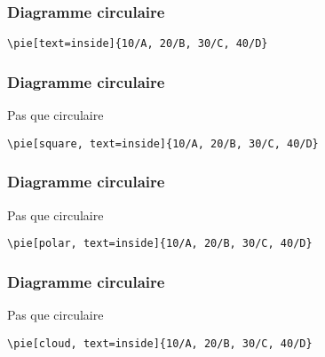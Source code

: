 \documentclass{clic_latex_beamer}
\begin{document}
\begin{frame}[fragile]
\frametitle{Diagramme circulaire}



\begin{lstlisting}
\pie[text=inside]{10/A, 20/B, 30/C, 40/D}
\end{lstlisting}

\end{frame}

\begin{frame}[fragile]
\frametitle{Diagramme circulaire}
Pas que circulaire



\begin{lstlisting}
\pie[square, text=inside]{10/A, 20/B, 30/C, 40/D}
\end{lstlisting}

\end{frame}

\begin{frame}[fragile]
\frametitle{Diagramme circulaire}
Pas que circulaire



\begin{lstlisting}
\pie[polar, text=inside]{10/A, 20/B, 30/C, 40/D}
\end{lstlisting}

\end{frame}

\begin{frame}[fragile]
\frametitle{Diagramme circulaire}
Pas que circulaire



\begin{lstlisting}
\pie[cloud, text=inside]{10/A, 20/B, 30/C, 40/D}
\end{lstlisting}

\end{frame}
\end{document}
